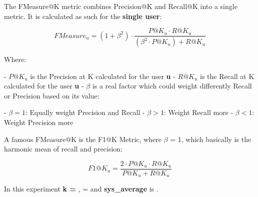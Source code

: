 \documentclass[12pt, a4paper]{article}
\begin{document}
\hfill\break\hfill\break
 The FMeasure@K metric combines Precision@K and Recall@K into a single metric.
 It is calculated as such for the
    \textbf{single user}:

    \[
    FMeasure_u = (1 + \beta^2) \cdot \frac{P@K_u \cdot R@K_u}{(\beta^2 \cdot P@K_u) + R@K_u}
    \]

    Where:

    - $P@K_u$ is the Precision at K calculated for the user \textbf{u}
    - $R@K_u$ is the Recall at K calculated for the user \textbf{u}
    - $\beta$ is a real factor which could weight differently Recall or Precision based on its value:

        - $\beta = 1$: Equally weight Precision and Recall
        - $\beta > 1$: Weight Recall more
        - $\beta < 1$: Weight Precision more

    A famous FMeasure@K is the F1@K Metric, where $\beta$ = 1, which basically is the harmonic mean of recall and
    precision:
    \hfill\break\hfill\break


    \[
    F1@K_u = \frac{2 \cdot P@K_u \cdot R@K_u}{P@K_u + R@K_u}
    \]




\hfill\break
\hfill\break
In this experiment \textbf{k = },
\text{\boldmath$\beta$} = \textbf{} and
\textbf{sys\_average} is \textbf{}.

\end{document}
